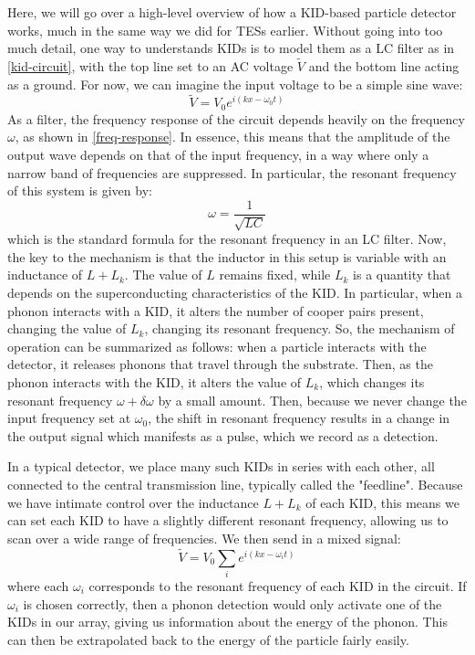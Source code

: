 Here, we will go over a high-level overview of how a KID-based particle detector works, much in the same way
we did for TESs earlier. Without going into too much detail, one way to understands KIDs is to model
them as a LC filter as in \cref{kid-circuit}, with the top line set to an AC voltage \( \tilde V \) and the bottom
line acting as a ground. For now, we can imagine the input voltage to be a simple sine wave:
\[
	\tilde V = V_0e^{i (kx - \omega_0 t)}
\]
As a filter, the frequency response of the circuit depends heavily on the frequency \( \omega \), as
shown in \cref{freq-response}. In essence, this means that the amplitude of the output wave depends on that
of the input frequency, in a way where only a narrow band of frequencies are suppressed. In
particular, the resonant frequency of this system is given by:
\[
	\omega = \frac{1}{\sqrt{LC}}
\]
which is the standard formula for the resonant frequency in an LC filter. 
Now, the key to the mechanism is that the inductor in this setup is variable with an
inductance of \( L + L_k \). The value of \( L \) remains fixed, while \( L_k \) is a quantity
that depends on the superconducting characteristics of the KID. 
In particular, when a phonon interacts with a KID, it alters the number of cooper pairs
present, changing the value of \( L_k \), changing its resonant frequency.     
So, the mechanism of operation can be summarized as follows: when a particle interacts with the detector, 
it releases phonons that travel through the substrate. Then, as the phonon interacts with the KID, it
alters the value of \( L_k \), which changes its resonant frequency \( \omega + \delta \omega \) 
by a small amount. Then,
because we never change the input frequency set at \( \omega_0 \), the shift in resonant frequency results in
a change in the output signal which manifests as a pulse, which we record as a detection.  

In a typical detector, we place many such KIDs in series with each other, all connected to the central
transmission line, typically called the "feedline". Because we have intimate control over the inductance 
\( L + L_k \) of each KID, this means we can set each KID to have a slightly different resonant frequency,
allowing us to scan over a wide range of frequencies. We then send in a mixed signal:
\[
	\tilde V = V_0 \sum_i e^{i(kx - \omega_i t)}
\]
where each \( \omega_i \) corresponds to the resonant frequency of each KID in the circuit. If \( \omega_i \)
is chosen correctly, then a phonon detection would only activate one of the KIDs in our array, giving us
information about the energy of the phonon. This can then be extrapolated back to the energy of the particle
fairly easily. 

